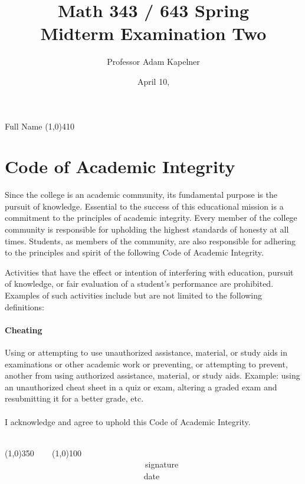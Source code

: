 \documentclass[12pt]{article}
\title{Math 343 / 643 Spring \the\year{} \\ Midterm Examination Two}
\author{Professor Adam Kapelner}
\date{April 10, \the\year{}}
\begin{document}
\maketitle

\noindent Full Name \line(1,0){410}

\thispagestyle{empty}

\section*{Code of Academic Integrity}

\footnotesize
Since the college is an academic community, its fundamental purpose is the pursuit of knowledge. Essential to the success of this educational mission is a commitment to the principles of academic integrity. Every member of the college community is responsible for upholding the highest standards of honesty at all times. Students, as members of the community, are also responsible for adhering to the principles and spirit of the following Code of Academic Integrity.

Activities that have the effect or intention of interfering with education, pursuit of knowledge, or fair evaluation of a student's performance are prohibited. Examples of such activities include but are not limited to the following definitions:

\paragraph{Cheating} Using or attempting to use unauthorized assistance, material, or study aids in examinations or other academic work or preventing, or attempting to prevent, another from using authorized assistance, material, or study aids. Example: using an unauthorized cheat sheet in a quiz or exam, altering a graded exam and resubmitting it for a better grade, etc.\\
\\
\noindent I acknowledge and agree to uphold this Code of Academic Integrity. \\~\\

\begin{center}
\line(1,0){350} ~~~ \line(1,0){100}\\
~~~~~~~~~~~~~~~~~~~~~~~~~~~~~~~~~~signature~~~~~~~~~~~~~~~~~~~~~~~~~~~~~~~~~~~~~~~~~~~~~~~~~~~~~~~~~~~~~~ date
\end{center}

\normalsize
\end{document}
